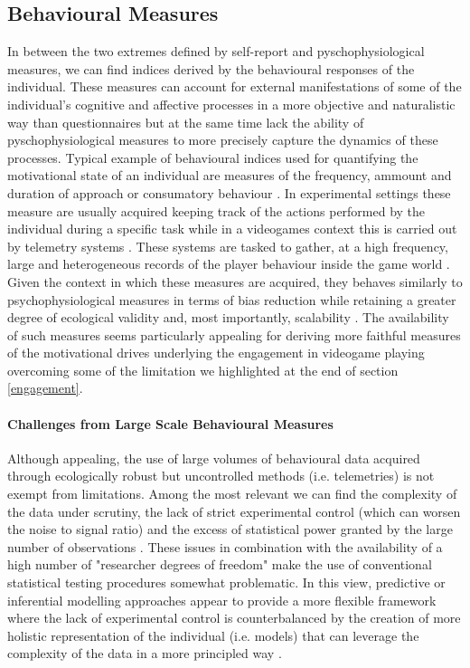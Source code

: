 \subsection{Behavioural Measures}
\label{behavioural_indices}
In between the two extremes defined by self-report and pyschophysiological measures, we can find indices derived by the behavioural responses of the individual. These measures can account for external manifestations of some of the individual's cognitive and affective processes in a more objective and naturalistic way than questionnaires but at the same time lack the ability of pyschophysiological measures to more precisely capture the dynamics of these processes. Typical example of behavioural indices used for quantifying the motivational state of an individual are measures of the frequency, ammount and duration of approach or consumatory behaviour \cite{berridge2004motivation, simpson2016behavioral}. In experimental settings these measure are usually acquired keeping track of the actions performed by the individual during a specific task \cite{berridge2009dissecting, simpson2016behavioral} while in a videogames context this is carried out by telemetry systems \cite{el2016game}. These systems are tasked to gather, at a high frequency,  large and heterogeneous records of the player behaviour inside the game world \cite{el2016game}. Given the context in which these measures are acquired, they behaves similarly to psychophysiological measures in terms of bias reduction while retaining a greater degree of ecological validity and, most importantly, scalability \cite{el2016game}. The availability of such measures seems particularly appealing for deriving more faithful measures of the motivational drives underlying the engagement in videogame playing overcoming some of the limitation we highlighted at the end of section \ref{engagement}.
    
\paragraph*{Challenges from Large Scale Behavioural Measures}
\label{challenges_large_scale}
Although appealing, the use of large volumes of behavioural data acquired through ecologically robust but uncontrolled methods (i.e. telemetries) is not exempt from limitations. Among the most relevant we can find the complexity of the data under scrutiny, the lack of strict experimental control (which can worsen the noise to signal ratio) and the excess of statistical power granted by the large number of observations \cite{orben2019association}. These issues in combination with the availability of a high number of "researcher degrees of freedom" \cite{simmons2016false} make the use of conventional statistical testing procedures somewhat problematic. In this view, predictive or inferential modelling approaches appear to provide a more flexible framework where the lack of experimental control is counterbalanced by the creation of more holistic representation of the individual (i.e. models) that can leverage the complexity of the data in a more principled way \cite{yannakakis2013player}.

